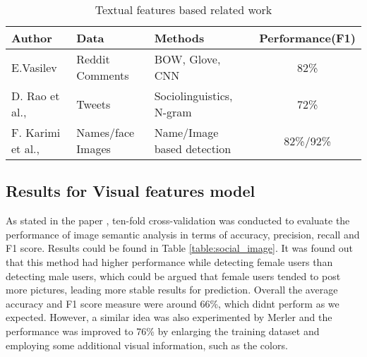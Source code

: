 \documentclass[runningheads]{llncs}
\begin{document}
	
		
	\begin{table}
		\caption{Textual features based related work }
		\centering
		\begin{tabular}{| l | l | l | c | }
			\hline
			Author  &  Data  & Methods & Performance(F1)\\
			\hline
			E.Vasilev \cite{Vasilev:Thesis:2018} &  Reddit Comments & BOW, Glove, CNN & 82\%\\
			D. Rao et al., \cite{rao2010classifying} &  Tweets  & Sociolinguistics, N-gram & 72\%\\
			F. Karimi et al., \cite{karimi2016inferring} & Names/face Images  & Name/Image based detection &  82\%/92\%\\
			\hline
		\end{tabular}
		\label{table:textual_work}
	\end{table}
	
	\subsection{Results for Visual features model}
	
	As stated in the paper \cite{you2014eyes}, ten-fold cross-validation was conducted to evaluate the performance of image semantic analysis in terms of accuracy, precision, recall and F1 score. Results could be found in Table \ref{table:social_image}. It was found out that this method had higher performance while detecting female users than detecting male users, which could be argued that female users tended to post more pictures, leading more stable results for prediction. Overall the average accuracy and F1 score measure were around 66\%, which didn\textquotesingle t perform as we expected. However, a similar idea was also experimented by Merler \cite{merler2015you} and the performance was improved to 76\% by enlarging the training dataset and employing some additional visual information, such as the colors. \\
	
\end{document}
